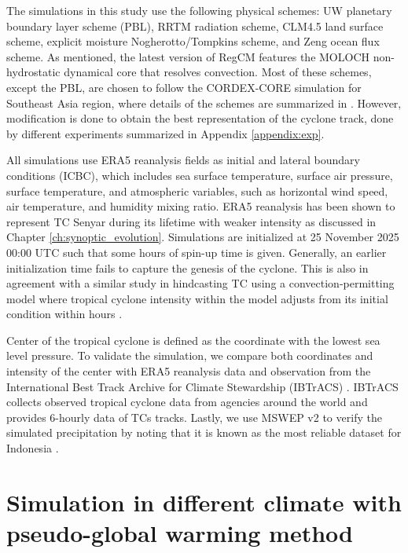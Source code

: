 The simulations in this study use the following physical schemes: UW planetary boundary layer scheme (PBL), RRTM radiation scheme, CLM4.5 land surface scheme, explicit moisture Nogherotto/Tompkins scheme, and Zeng ocean flux scheme. As mentioned, the latest version of RegCM features the MOLOCH non-hydrostatic dynamical core that resolves convection. Most of these schemes, except the PBL, are chosen to follow the CORDEX-CORE simulation for Southeast Asia region, where details of the schemes are summarized in \citet{coppola20255th}. However, modification is done to obtain the best representation of the cyclone track, done by different experiments summarized in Appendix \ref{appendix:exp}.

All simulations use ERA5 reanalysis fields \citep{hersbach2020era5} as initial and lateral boundary conditions (ICBC), which includes sea surface temperature, surface air pressure, surface temperature, and atmospheric variables, such as horizontal wind speed, air temperature, and humidity mixing ratio. ERA5 reanalysis has been shown to represent TC Senyar during its lifetime with weaker intensity as discussed in Chapter \ref{ch:synoptic_evolution}. Simulations are initialized at 25 November 2025 00:00 UTC such that some hours of spin-up time is given. Generally, an earlier initialization time fails to capture the genesis of the cyclone. This is also in agreement with a similar study in hindcasting TC using a convection-permitting model where tropical cyclone intensity within the model adjusts from its initial condition within hours \citep{patricola2018anthropogenic}.

Center of the tropical cyclone is defined as the coordinate with the lowest sea level pressure. To validate the simulation, we compare both coordinates and intensity of the center with ERA5 reanalysis data and observation from the International Best Track Archive for Climate Stewardship (IBTrACS) \citep{knapp2010international, IBTrACS_data}. IBTrACS collects observed tropical cyclone data from agencies around the world and provides 6-hourly data of TCs tracks. Lastly, we use MSWEP v2 \citep{beck2019mswep} to verify the simulated precipitation by noting that it is known as the most reliable dataset for Indonesia \citep{wati2022statistics}.

\section{Simulation in different climate with pseudo-global warming method}

